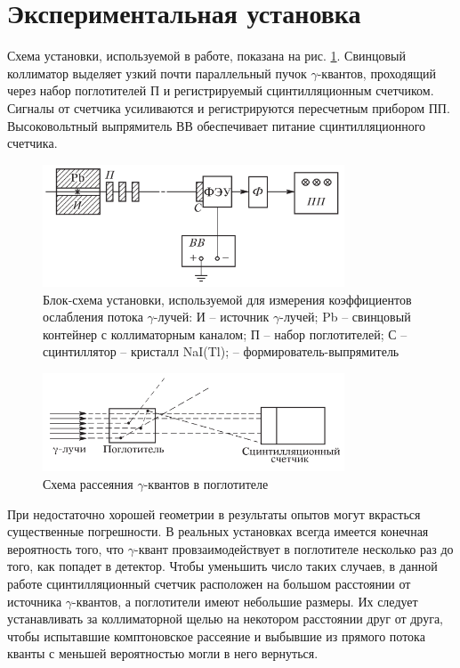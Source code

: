 \documentclass[a4paper,12pt]{article}
\begin{document}
\section{Экспериментальная установка}
    Схема установки, используемой в работе, показана на рис. \hyperref[fig: Exp setup]{1}. Свинцовый коллиматор выделяет узкий почти параллельный пучок $\gamma$-квантов, проходящий через набор поглотителей П и регистрируемый сцинтилляционным счетчиком. Сигналы от счетчика усиливаются и регистрируются пересчетным прибором ПП. Высоковольтный выпрямитель ВВ обеспечивает питание сцинтилляционного счетчика.
    \begin{figure}[H]\label{fig: Exp setup}
        \centering
        \includegraphics[width = 0.8\textwidth]{Exp setup.png}
        \caption{Блок-схема установки, используемой для измерения коэффициентов ослабления потока $\gamma$-лучей: И -- источник $\gamma$-лучей; Pb -- свинцовый контейнер с коллиматорным каналом; П -- набор поглотителей; С -- сцинтиллятор -- кристалл NaI(Tl); -- формирователь-выпрямитель}
    \end{figure}
    
    \begin{figure}[H]\label{fig: Scattering scheme}
        \centering
        \includegraphics[width = 0.8\textwidth]{Scattering scheme.png}
        \caption{Схема рассеяния $\gamma$-квантов в поглотителе}
    \end{figure}

    При недостаточно хорошей геометрии в результаты опытов могут вкрасться существенные погрешности. В реальных установках всегда имеется конечная вероятность того, что $\gamma$-квант провзаимодействует в поглотителе несколько раз до того, как попадет в детектор. Чтобы уменьшить число таких случаев, в данной работе сцинтилляционный счетчик расположен на большом расстоянии от источника $\gamma$-квантов, а поглотители имеют небольшие размеры. Их следует устанавливать за коллиматорной щелью на некотором расстоянии друг от друга, чтобы испытавшие комптоновское рассеяние и выбывшие из прямого потока кванты с меньшей вероятностью могли в него вернуться.
\end{document}
